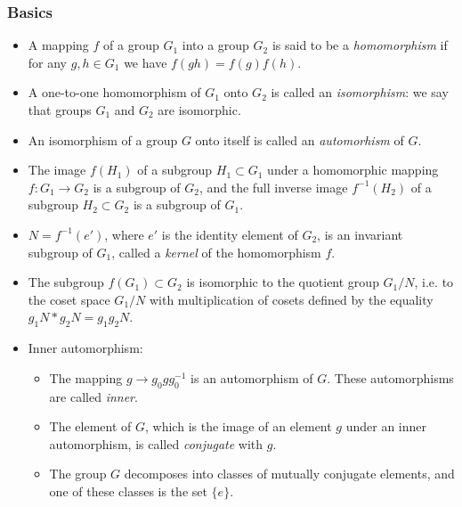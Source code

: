 \subsubsection{Basics}
\begin{itemize}
	\item A mapping $f$ of a group $G_1$ into a group $G_2$ is said to be a \emph{homomorphism} if for any $g, h \in G_1$ we have $f(gh) = f(g)f(h)$.
	\item A one-to-one homomorphism of $G_1$ onto $G_2$ is called an \emph{isomorphism}: we say that groups $G_1$ and $G_2$ are isomorphic.
	\item An isomorphism of a group
	$G$ onto itself is called an \emph{automorhism} of $G$.
	\item The image $f(H_1)$ of a subgroup $H_1\subset G_1$ under a homomorphic mapping
	$f:G_1\rightarrow G_2$ is a subgroup of $G_2$, and the full inverse image $f^{-1}(H_2)$ of a subgroup $H_2 \subset G_2$ is a subgroup of $G_1$.
	\item $N=f^{-1}(e')$, where $e'$ is the identity element of $G_2$, is an invariant subgroup of $G_1$, called a \emph{kernel} of the homomorphism $f$.
	\item The subgroup $f(G_1)\subset G_2$
	is isomorphic to the quotient group $G_1/N$, i.e. to the
	coset space $G_1/N$ with multiplication of cosets defined by the equality $g_1N*g_2N = g_1g_2N$.
	\item Inner automorphism:
	\begin{itemize}
		\item The mapping $g\rightarrow g_0gg_0^{-1}$ is an automorphism of $G$. These automorphisms are called \emph{inner}.
		\item The element of $G$, which is the image of an element $g$ under an inner automorphism, is called \emph{conjugate} with $g$.
		\item The group $G$ decomposes into classes of mutually conjugate elements, and one of these classes is the set $\{e\}$.
	\end{itemize}
\end{itemize}
